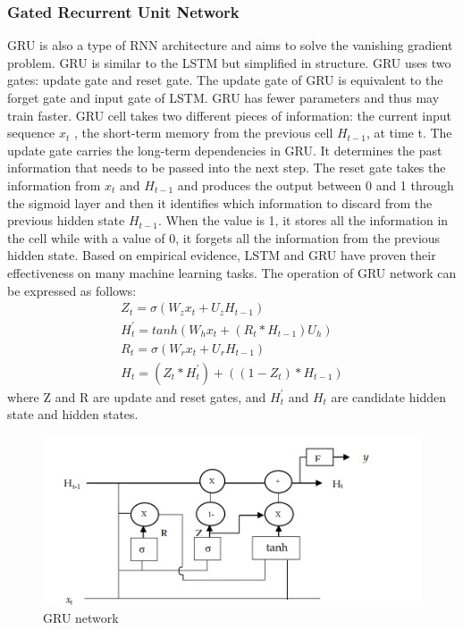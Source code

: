 \subsubsection{Gated Recurrent Unit Network}
\vspace{-18pt}
GRU is also a type of RNN architecture and aims to solve the vanishing gradient problem. GRU is similar to the LSTM but simplified in structure. GRU uses two gates: update gate and reset gate. The update gate of GRU is equivalent to the forget gate and input gate of LSTM. GRU has fewer parameters and thus may train faster. GRU cell takes two different pieces of information: the current input sequence $x_t$ , the short-term memory from the previous cell $H_{t-1}$, at time t. The update gate carries the long-term dependencies in GRU. It determines the past information that needs to be passed into the next step. The reset gate takes the information from $x_t$ and $H_{t-1}$ and produces the output between 0 and 1 through the sigmoid layer and then it identifies which information to discard from the previous hidden state $H_{t-1}$. When the value is 1, it stores all the information in the cell while with a value of 0, it forgets all the information from the previous hidden state. Based on empirical evidence, LSTM and GRU have proven their effectiveness on many machine learning tasks. The operation of GRU network can be expressed as follows: 
\begin{eqnarray}
Z_t = \sigma(W_zx_t + U_zH_{t-1})\\
H^{'}_t = tanh(W_hx_t + (R_t * H_{t-1})U_h)\\
R_t = \sigma(W_rx_t + U_rH_{t-1})\\
H_t = (Z_t*H^{'}_t)+((1-Z_t)*H_{t-1})
\end{eqnarray}
where Z and R are update and reset gates, and $H^{'}_t$ and $H_t$ are candidate hidden state and hidden states.
\begin{figure}[tbh] %
\begin{center}
	\includegraphics[width=5in]{images/gfig.png} 
	\caption{GRU network} %
	\label{GRU network} %
\end{center}
\end{figure}
